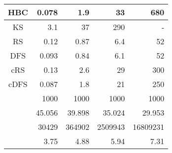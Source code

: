 \begin{table}
\begin{minipage}[t]{178pt}
\begin{center}
\begin{tabular}[c]{| r | r | r | r | r |}
\multicolumn{1}{|c||}{HBC} & 0.078 & 1.9 & 33 & 680 \\\hline
\multicolumn{1}{|c||}{KS} & 3.1 & 37 & 290 & - \\\hline
\multicolumn{1}{|c||}{RS} & 0.12 & 0.87 & 6.4 & 52\\\hline
\multicolumn{1}{|c||}{DFS} & 0.093 & 0.84 & 6.1 & 52\\\hline
\multicolumn{1}{|c||}{cRS} & 0.13 & 2.6 & 29 & 300\\\hline
\multicolumn{1}{|c||}{cDFS} & 0.087 & 1.8 & 21 & 250\\\hline
\hline 
\multicolumn{1}{|c||}{} & 1000 & 1000 & 1000 & 1000\\\hline
\multicolumn{1}{|c||}{} & 45.056 & 39.898 & 35.024 & 29.953\\\hline
\multicolumn{1}{|c||}{} & 30429 & 364902 & 2509943 & 16809231\\\hline
\multicolumn{1}{|c||}{} & 3.75 & 4.88 & 5.94 & 7.31 \\\hline
\end{tabular}
\end{center}
\end{minipage}
\end{table} 

